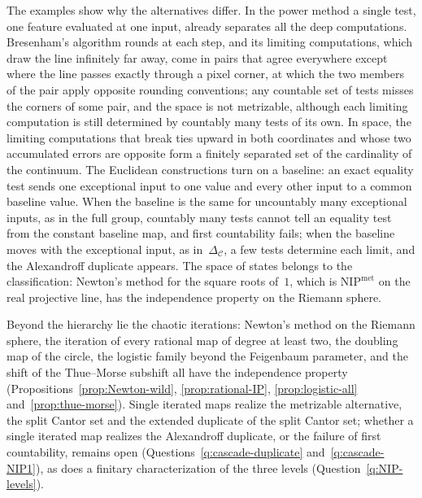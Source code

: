 \documentclass[psamsfonts]{amsart}
\theoremstyle{definition}
\theoremstyle{remark}
\newcommand{\NIP}{\text{NIP}}
\numberwithin{equation}{section}
\begin{document}
The examples show why the alternatives differ.
In the power method a single test, one feature evaluated at one input, already separates all the deep computations.
Bresenham's algorithm rounds at each step, and its limiting computations, which draw the line infinitely far away, come in pairs that agree everywhere except where the line passes exactly through a pixel corner, at which the two members of the pair apply opposite rounding conventions; any countable set of tests misses the corners of some pair, and the space is not metrizable, although each limiting computation is still determined by countably many tests of its own.
In space, the limiting computations that break ties upward in both coordinates and whose two accumulated errors are opposite form a finitely separated set of the cardinality of the continuum.
The Euclidean constructions turn on a baseline: an exact equality test sends one exceptional input to one value and every other input to a common baseline value.
When the baseline is the same for uncountably many exceptional inputs, as in the full group, countably many tests cannot tell an equality test from the constant baseline map, and first countability fails; when the baseline moves with the exceptional input, as in~$\Delta_{\mathcal{C}}$, a few tests determine each limit, and the Alexandroff duplicate appears.
The space of states belongs to the classification: Newton's method for the square roots of~$1$, which is $\NIP^{\mathrm{met}}$ on the real projective line, has the independence property on the Riemann sphere.

Beyond the hierarchy lie the chaotic iterations: Newton's method on the Riemann sphere, the iteration of every rational map of degree at least two, the doubling map of the circle, the logistic family beyond the Feigenbaum parameter, and the shift of the Thue--Morse subshift all have the independence property (Propositions~\ref{prop:Newton-wild}, \ref{prop:rational-IP}, \ref{prop:logistic-all} and~\ref{prop:thue-morse}).
Single iterated maps realize the metrizable alternative, the split Cantor set and the extended duplicate of the split Cantor set; whether a single iterated map realizes the Alexandroff duplicate, or the failure of first countability, remains open (Questions~\ref{q:cascade-duplicate} and~\ref{q:cascade-NIP1}), as does a finitary characterization of the three levels (Question~\ref{q:NIP-levels}).
\end{document}
